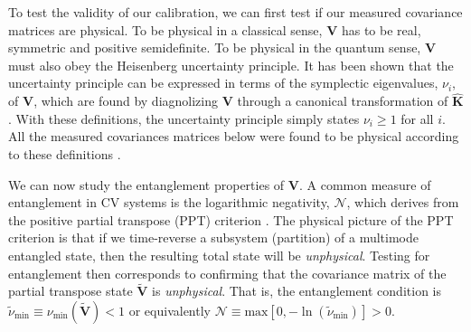 \documentclass[prl,10pt,twocolumn,superscriptaddress,notitlepage,floatfix,amssymb]{revtex4}
\begin{document}
To test the validity of our calibration, we can first test if our measured covariance matrices are physical. To be physical in a classical sense, $\mathbf{V}$ has to be real, symmetric and positive semidefinite. 
To be physical in the quantum sense, $\mathbf{V}$ must also obey the Heisenberg uncertainty principle. 
It has been shown \cite{Simon:1994gb} that the uncertainty principle can be expressed in terms of the symplectic eigenvalues, $\nu_i$, of $\mathbf{V}$, which are found by diagnolizing $\mathbf{V}$ through a canonical transformation of $\mathbf{\hat{K}}$.  With these definitions, the uncertainty principle simply states $\nu_i \geq 1$ for all $i$. All the measured covariances matrices below were found to be physical according to these definitions \cite{SupNote}.


We can now study the entanglement properties of $\mathbf{V}$.  A common measure of entanglement in CV systems is the logarithmic negativity, $\mathcal{N}$, which derives from the positive partial transpose (PPT) criterion \cite{Simon:2000fd,Adesso:2005fw}. The physical picture of the PPT criterion is that if we time-reverse a subsystem (partition) of a multimode entangled state, then the resulting total state will be \textit{unphysical}.  Testing for entanglement then corresponds to confirming that the covariance matrix of the partial transpose state $\widetilde{\mathbf{V}}$ is \textit{unphysical}. That is, the entanglement condition is  $\widetilde{\nu}_{\text{min}}\equiv \nu_{\text{min}}(\widetilde{\mathbf{V}}) < 1$ or equivalently $\mathcal{N} \equiv \textrm{max}[0,-\ln(\widetilde{\nu}_{\text{min}})] > 0$.
\end{document}
